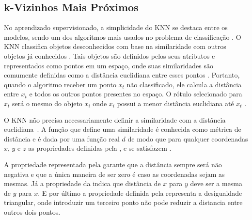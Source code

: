 \subsection{k-Vizinhos Mais Próximos}
\label{sec:knn}

No aprendizado supervisionado, a simplicidade do \acrfull{KNN} \cite{knn} se destaca entre os modelos, sendo um dos algoritmos mais usados no problema de classificação \cite{larose2014discovering}. O \acrshort{KNN} classifica objetos desconhecidos com base na similaridade com outros objetos já conhecidos \cite{larose2014discovering}. Tais objetos são definidos pelos seus atributos e representados como pontos em um espaço, onde suas similaridades são comumente definidas como a distância euclidiana entre esses pontos \cite{larose2014discovering}. Portanto, quando o algoritmo receber um ponto $x_t$ não classificado, ele calcula a distância entre $x_t$ e todos os outros pontos presentes no espaço. O rótulo selecionado para $x_t$ será o mesmo do objeto $x_i$ onde $x_i$ possui a menor distância euclidiana até $x_t$ \cite{faceli2011inteligencia}.

O \acrshort{KNN} não precisa necessariamente definir a similaridade com a distância euclidiana~\cite{larose2014discovering}. A função que define uma similaridade é conhecida como métrica de distância e é dada por uma função real $d$ de modo que para qualquer coordenadas $x$, $y$ e $z$ as propriedades definidas pela ,  e  se satisfazem \cite{}.


A propriedade representada pela  garante que a distância sempre será não negativa e que a única maneira de ser zero é caso as coordenadas sejam as mesmas. Já a propriedade da  indica que  distância de $x$ para $y$ deve ser a mesma de $y$ para $x$. E por último a propriedade definida pela  representa a desigualdade triangular, onde introduzir um terceiro ponto não pode reduzir a distancia entre outros dois pontos.

